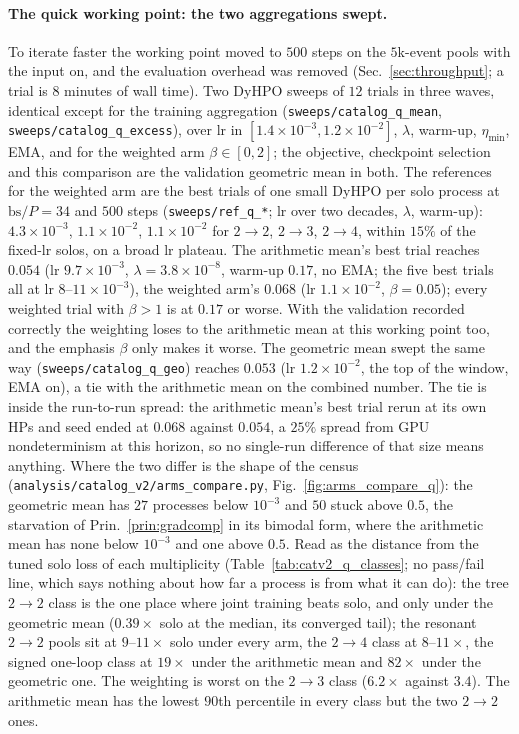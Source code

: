 \documentclass[11pt]{article}
\newcommand{\code}[1]{\texttt{#1}}
\begin{document}
\paragraph{The quick working point: the two aggregations swept.} To iterate faster the
working point moved to $500$ steps on the $5$k-event pools with the input on, and the
evaluation overhead was removed (Sec.~\ref{sec:throughput}; a trial is $8$ minutes of wall
time). Two DyHPO sweeps of $12$ trials in three waves, identical except for the training
aggregation (\code{sweeps/catalog\_q\_mean}, \code{sweeps/catalog\_q\_excess}), over lr in
$[1.4\times10^{-3},1.2\times10^{-2}]$, $\lambda$, warm-up, $\eta_{\min}$, EMA, and for the
weighted arm $\beta\in[0,2]$; the objective, checkpoint selection and this comparison are the
validation geometric mean in both. The references for the weighted arm are the best trials
of one small DyHPO per solo process at $\mathrm{bs}/P=34$ and $500$ steps
(\code{sweeps/ref\_q\_*}; lr over two decades, $\lambda$, warm-up): $4.3\times10^{-3}$,
$1.1\times10^{-2}$, $1.1\times10^{-2}$ for $2\to2$, $2\to3$, $2\to4$, within $15\%$ of the
fixed-lr solos, on a broad lr plateau. The arithmetic mean's best trial reaches $0.054$
(lr $9.7\times10^{-3}$, $\lambda=3.8\times10^{-8}$, warm-up $0.17$, no EMA; the five best
trials all at lr $8$--$11\times10^{-3}$), the weighted arm's $0.068$ (lr $1.1\times10^{-2}$,
$\beta=0.05$); every weighted trial with $\beta>1$ is at $0.17$ or worse. With the
validation recorded correctly the weighting loses to the arithmetic mean at this working
point too, and the emphasis $\beta$ only makes it worse. The geometric mean swept the
same way (\code{sweeps/catalog\_q\_geo}) reaches $0.053$ (lr $1.2\times10^{-2}$, the top of
the window, EMA on), a tie with the arithmetic mean on the combined number. The tie is
inside the run-to-run spread: the arithmetic mean's best trial rerun at its own HPs and
seed ended at $0.068$ against $0.054$, a $25\%$ spread from GPU nondeterminism at this
horizon, so no single-run difference of that size means anything. Where the two differ is
the shape of the census (\code{analysis/catalog\_v2/arms\_compare.py},
Fig.~\ref{fig:arms_compare_q}): the geometric mean has $27$ processes below $10^{-3}$ and
$50$ stuck above $0.5$, the starvation of Prin.~\ref{prin:gradcomp} in its bimodal form,
where the arithmetic mean has none below $10^{-3}$ and one above $0.5$. Read as the
distance from the tuned solo loss of each multiplicity (Table~\ref{tab:catv2_q_classes}; no
pass/fail line, which says nothing about how far a process is from what it can do): the
tree $2\to2$ class is the one place where joint training beats solo, and only under the geometric
mean ($0.39\times$ solo at the median, its converged tail); the resonant $2\to2$ pools sit
at $9$--$11\times$ solo under every arm, the $2\to4$ class at $8$--$11\times$, the signed
one-loop class at $19\times$ under the arithmetic mean and $82\times$ under the geometric
one. The weighting is worst on the $2\to3$ class ($6.2\times$ against $3.4$). The
arithmetic mean has the lowest $90$th percentile in every class but the two $2\to2$ ones.
\end{document}
